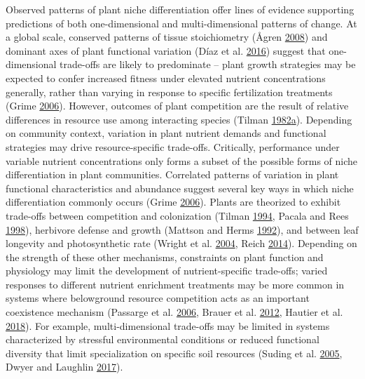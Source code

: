 \documentclass[twoside,12pt,final]{ucthesis-CA2012}
\begin{document}
\begin{ucmainmatter}
Observed patterns of plant niche differentiation offer lines of evidence supporting predictions of both one-dimensional and multi-dimensional patterns of change. At a global scale, conserved patterns of tissue stoichiometry (Ågren \protect\hyperlink{ref-Agren2008}{2008}) and dominant axes of plant functional variation (Díaz et al. \protect\hyperlink{ref-Diaz2016}{2016}) suggest that one-dimensional trade-offs are likely to predominate -- plant growth strategies may be expected to confer increased fitness under elevated nutrient concentrations generally, rather than varying in response to specific fertilization treatments (Grime \protect\hyperlink{ref-Grime2006}{2006}).
However, outcomes of plant competition are the result of relative differences in resource use among interacting species (Tilman \protect\hyperlink{ref-tilman1982resource}{1982}\protect\hyperlink{ref-tilman1982resource}{a}).
Depending on community context, variation in plant nutrient demands and functional strategies may drive resource-specific trade-offs.
Critically, performance under variable nutrient concentrations only forms a subset of the possible forms of niche differentiation in plant communities. Correlated patterns of variation in plant functional characteristics and abundance suggest several key ways in which niche differentiation commonly occurs (Grime \protect\hyperlink{ref-Grime2006}{2006}).
Plants are theorized to exhibit trade-offs between competition and colonization (Tilman \protect\hyperlink{ref-Tilman1994}{1994}, Pacala and Rees \protect\hyperlink{ref-Pacala1998}{1998}), herbivore defense and growth (Mattson and Herms \protect\hyperlink{ref-Mattson1992}{1992}), and between leaf longevity and photosynthetic rate (Wright et al. \protect\hyperlink{ref-Wright2004}{2004}, Reich \protect\hyperlink{ref-Reich2014}{2014}).
Depending on the strength of these other mechanisms, constraints on plant function and physiology may limit the development of nutrient-specific trade-offs; varied responses to different nutrient enrichment treatments may be more common in systems where belowground resource competition acts as an important coexistence mechanism (Passarge et al. \protect\hyperlink{ref-Passarge2006}{2006}, Brauer et al. \protect\hyperlink{ref-Brauer2012}{2012}, Hautier et al. \protect\hyperlink{ref-Hautier2018}{2018}).
For example, multi-dimensional trade-offs may be limited in systems characterized by stressful environmental conditions or reduced functional diversity that limit specialization on specific soil resources (Suding et al. \protect\hyperlink{ref-Suding2005}{2005}, Dwyer and Laughlin \protect\hyperlink{ref-Dwyer2017}{2017}).

\end{ucmainmatter}
\end{document}

